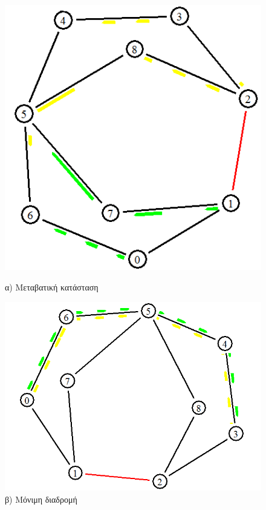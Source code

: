 \documentclass{article}%
\begin{document}
\begin{itemize}
	\begin{figure}[htbp]
\centering
\begin{minipage}{0.33\textwidth}
\centering
\includegraphics[width=1.00\textwidth]{4.png}
\caption{α) Μεταβατική κατάσταση}
\end{minipage}\hfill
\begin{minipage}{0.35\textwidth}
\centering
\includegraphics[width=1.00\textwidth]{3.png}
\caption{β) Μόνιμη διαδρομή}

\end{minipage}
\end{figure}
\end{itemize}
\end{document}
